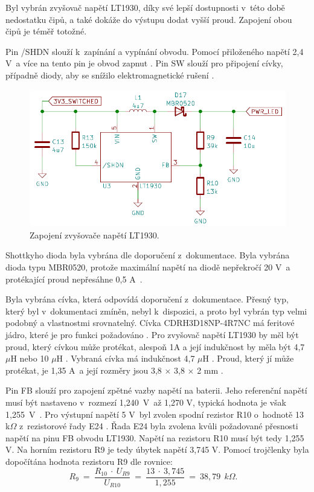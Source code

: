 Byl vybrán zvyšovač napětí LT1930, díky své lepší dostupnosti v~této době nedostatku čipů, a také dokáže do výstupu dodat vyšší proud. Zapojení obou čipů je téměř totožné. 

Pin /SHDN slouží k~zapínání a vypínání obvodu. Pomocí přiloženého napětí 2,4 V~a více na tento pin je obvod zapnut \cite{LT1930_dtsh}. Pin SW slouží pro  připojení cívky, 
případně diody, aby se snížilo elektromagnetické rušení \cite{LT1930_dtsh}. 

\begin{figure}[!h]
  \begin{center}
    \includegraphics[scale=0.6]{obrazky/LT1930.png}
  \end{center}
  \caption[Zapojení zvyšovače napětí LT1930]{Zapojení zvyšovače napětí LT1930.}
\end{figure}

Shottkyho dioda byla vybrána dle doporučení z~dokumentace. Byla vybrána dioda typu MBR0520, protože maximální napětí na diodě nepřekročí 20 V~a protékající proud nepřesáhne 
0,5 A~\cite{LT1930_dtsh}.

Byla vybrána cívka, která odpovídá doporučení z~dokumentace. Přesný typ, který byl v~dokumentaci zmíněn, nebyl k~dispozici, a proto byl vybrán typ velmi podobný a vlastnostmi 
srovnatelný. Cívka CDRH3D18NP-4R7NC má feritové jádro, které je pro funkci požadováno \cite{LT1930_dtsh} \cite{civka_dtsh}. Pro zvyšovač napětí LT1930 by měl být proud, který cívkou může protékat, 
alespoň 1A a její indukčnost by měla být 4,7 $\mu$H nebo 10 $\mu$H \cite{LT1930_dtsh}. Vybraná cívka má indukčnost 4,7 $\mu$H \cite{civka_dtsh}. Proud, který jí může protékat, je 1,35 A~a její rozměry 
jsou 3,8 $\times$ 3,8 $\times$ 2 mm \cite{civka_dtsh}.

Pin FB slouží  pro zapojení zpětné vazby napětí na baterii. Jeho referenční napětí musí být nastaveno v~rozmezí 1,240~V~až 1,270 V, typická hodnota je však 1,255~V~\cite{LT1930_dtsh}. 
Pro výstupní napětí 5 V~byl zvolen spodní rezistor R10 o~hodnotě 13 k$\Omega$ z~rezistorové řady E24 \cite{rezistorova_rada}. Řada E24 byla zvolena kvůli požadované přesnosti
napětí na pinu FB obvodu LT1930. Napětí na rezistoru R10 musí být tedy 1,255 V. Na horním rezistoru R9 je tedy úbytek napětí 3,745 V. Pomocí trojčlenky byla dopočítána hodnota 
rezistoru R9 dle rovnice:
\begin{equation} 
  R_{9}~=~\frac{R_{10}~\cdot~U_{R9}}{U_{R10}}~=~\frac{13~\cdot~3,745}{1,255}~=~38,79~\:k\Omega. 
  \quad
\label{eq:R9}
\end{equation}


